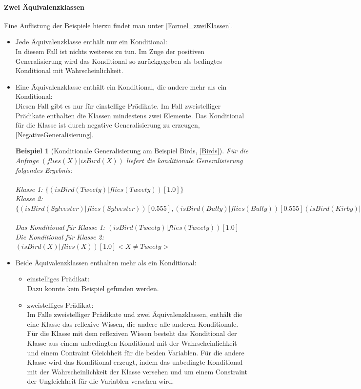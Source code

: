 \documentclass[a4paper, 11pt]{book}
\newtheorem{Bsp}{Beispiel}[section]
\begin{document}
\paragraph{Zwei Äquivalenzklassen}
Eine Auflistung der Beispiele hierzu findet man unter \ref{Formel_zweiKlassen}.
\begin{itemize}
	\item Jede Äquivalenzklasse enthält nur ein Konditional:\\
	In diesem Fall ist nichts weiteres zu tun. Im Zuge der positiven Generalisierung wird das Konditional so zurückgegeben als bedingtes Konditional mit Wahrscheinlichkeit.
	\item Eine Äquivalenzklasse enthält ein Konditional, die andere mehr als ein Konditional:\\
	Diesen Fall gibt es nur für einstellige Prädikate. Im Fall zweistelliger Prädikate enthalten die Klassen mindestens zwei Elemente. Das Konditional für die Klasse ist durch negative Generalisierung zu erzeugen, \ref{NegativeGeneralisierung}. 
	\begin{Bsp}[Konditionale Generalisierung am Beispiel Birds, \ref{Birds}]
	Für die Anfrage $ (flies(X) | isBird(X)) $ liefert die konditionale Generalisierung folgendes Ergebnis:\\
	\\
	Klasse 1: $ \{(isBird(Tweety)|flies(Tweety))[1.0]\} $\\
	Klasse 2: $ \{(isBird(Sylvester)|flies(Sylvester))[0.555], (isBird(Bully)|flies(Bully))[0.555] (isBird(Kirby)|flies(Kirby))[0.555] \}  $\\
	\\
	Das Konditional für Klasse 1: $ (isBird(Tweety)|flies(Tweety))[1.0]$\\
	Die Konditional für Klasse 2: $ (isBird(X)|flies(X))[1.0] <X \neq Tweety>$\\
	\end{Bsp}
	\item Beide Äquivalenzklassen enthalten mehr als ein Konditional:\\
	\begin{itemize}
		\item einstelliges Prädikat:\\
		Dazu konnte kein Beispiel gefunden werden.
		\item zweistelliges Prädikat:\\
		Im Falle zweistelliger Prädikate und zwei Äquivalenzklassen, enthält die eine Klasse das reflexive Wissen, die andere alle anderen Konditionale. Für die Klasse mit dem reflexiven Wissen besteht das Konditional der Klasse aus einem unbedingten Konditional mit der Wahrscheinlichkeit und einem Contraint Gleichheit für die beiden Variablen. Für die andere Klasse wird das Konditional erzeugt, indem das unbedingte Konditional mit der Wahrscheinlichkeit der Klasse versehen und um einem Constraint der Ungleichheit für die Variablen versehen wird.

\end{itemize}
\end{itemize}
\end{document}
